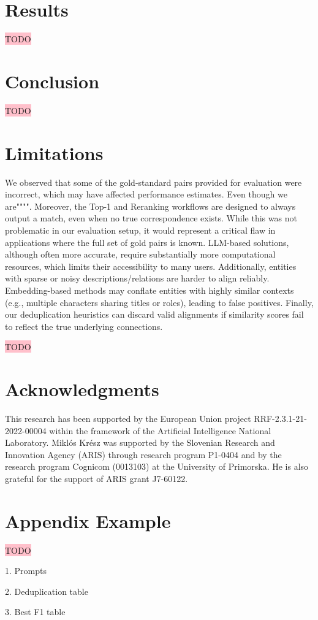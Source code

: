 \documentclass[11pt]{article}
\begin{document}
\section{Results}

\colorbox{pink}{TODO}

\section*{Conclusion}

\colorbox{pink}{TODO}

\section*{Limitations}
We observed that some of the gold-standard pairs provided for evaluation were incorrect, which may have affected performance estimates. Even though we are"""". Moreover, the Top-1 and Reranking workflows are designed to always output a match, even when no true correspondence exists. While this was not problematic in our evaluation setup, it would represent a critical flaw in applications where the full set of gold pairs is known. LLM-based solutions, although often more accurate, require substantially more computational resources, which limits their accessibility to many users. 
Additionally, entities with sparse or noisy descriptions/relations are harder to align reliably. Embedding-based methods may conflate entities with highly similar contexts (e.g., multiple characters sharing titles or roles), leading to false positives. Finally, our deduplication heuristics can discard valid alignments if similarity scores fail to reflect the true underlying connections.

\colorbox{pink}{TODO}

\section*{Acknowledgments}
This research has been supported by the European Union project RRF-2.3.1-21-2022-00004 within the framework of the Artificial Intelligence National Laboratory. Miklós Krész was supported by the Slovenian Research and Innovation Agency (ARIS) through research program P1-0404 and by the research program Cognicom (0013103) at the University of Primorska. He is also grateful for the support of ARIS grant J7-60122.



\appendix

\section{Appendix Example}

\colorbox{pink}{TODO} 

1. Prompts

2. Deduplication table

3. Best F1 table
\end{document}
